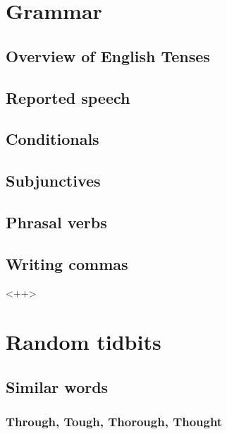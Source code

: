 \documentclass[a4paper,12pt]{report}
\begin{document}
\titlep
\tocp


\chapter{Grammar}

\section{Overview of English Tenses}



\section{Reported speech}

\section{Conditionals}

\section{Subjunctives}

\section{Phrasal verbs}

\section{Writing commas}

<++>

\chapter{Random tidbits}


\section{Similar words}



\subsection{Through, Tough, Thorough, Thought}
\end{document}
